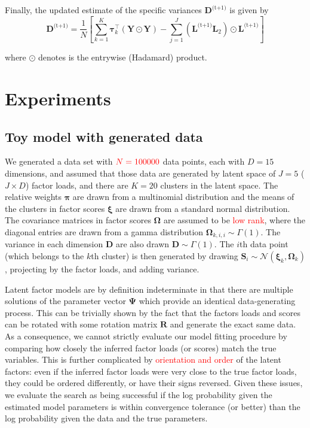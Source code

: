 \documentclass[twocolumn]{aastex61}
\newcommand{\todo}[1]{\textcolor{red}{#1}}
\newcommand{\vect}[1]{\boldsymbol{\mathbf{#1}}}
\renewcommand{\vec}[1]{\vect{#1}}
\newcommand{\weight}{\pi}
\newcommand{\data}{\textbf{Y}}
\newcommand{\vecdata}{\vec\data}
\newcommand{\nextstep}{^\textrm{(t+1)}}
\newcommand{\transpose}{^\intercal}
\newcommand{\factorloads}{\textbf{L}}
\newcommand{\factorscores}{\textbf{S}}
\newcommand{\specificvariance}{\vec{D}}
\newcommand{\scoremeans}{\vec\xi}
\newcommand{\scorecovs}{\vec\Omega}
\begin{document}
Finally, the updated estimate of the specific variances $\specificvariance\nextstep$ is given
by
\begin{equation}
	\specificvariance\nextstep = \frac{1}{N}\left[\sum^{K}_{k=1}\vec\tau_k\transpose\left(\vecdata\odot\vecdata\right) - \sum_{j=1}^{J}\left(\factorloads\nextstep\factorloads_2\right)\odot\factorloads\nextstep\right]
\end{equation}

\noindent{}where $\odot$ denotes is the entrywise (Hadamard) product.


\section{Experiments} \label{sec:experiments}

\subsection{Toy model with generated data} \label{sec:experiment-toy-model}

We generated a data set with $\todo{N = 100000}$ data points, each with
$D = 15$ dimensions, and assumed that those data are generated by
latent space of $J = 5$ ($J \times D$) factor loads, and there are $K = 20$
clusters in the latent space. The relative weights $\vec\weight$
are drawn from a multinomial distribution and the means of the clusters
in factor scores $\scoremeans$ are drawn from a standard normal
distribution. The covariance matrices in factor scores $\scorecovs$ are assumed to be \todo{low rank}, where the diagonal entries are drawn from a gamma distribution $\scorecovs_{k,i,i} \sim \Gamma(1)$. The variance in 
each dimension $\specificvariance$ are also drawn $\specificvariance \sim \Gamma(1)$.
The $i$th data point (which belongs to the $k$th cluster) is then
generated by drawing $\factorscores_{i} \sim \mathcal{N}(\scoremeans_k,\scorecovs_k)$, projecting by the factor loads, and adding variance.

Latent factor models are by definition indeterminate in that there are
multiple solutions of the parameter vector $\vec\Psi$ which provide
an identical data-generating process. This can be trivially shown by
the fact that the factors loads and scores can be rotated with some rotation
matrix $\textbf{R}$ and generate the exact same data. As a consequence,
we cannot strictly evaluate our model fitting procedure by comparing
how closely the inferred factor loads (or scores) match the true 
variables. This is further complicated by \todo{orientation and order}
of the latent factors: even if the inferred factor loads were very close
to the true factor loads, they could be ordered differently, or have
their signs reversed. Given these issues, we evaluate the search as
being successful if the log probability given the estimated model
parameters is within convergence tolerance (or better) than the
log probability given the data and the true parameters.
\end{document}
